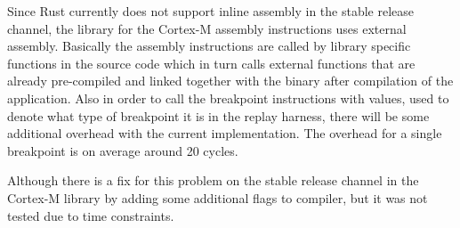 Since Rust currently does not support inline assembly in the stable release
channel, the library for the Cortex-M assembly instructions uses external
assembly. Basically the assembly instructions are called by library specific
functions in the source code which in turn calls external functions that are
already pre-compiled and linked together with the binary after compilation of
the application. Also in order to call the breakpoint instructions with values,
used to denote what type of breakpoint it is in the replay harness, there will
be some additional overhead with the current implementation. The overhead for a
single breakpoint is on average around 20 cycles.

Although there is a fix for this problem on the stable release channel in the
Cortex-M library by adding some additional flags to compiler, but it was not
tested due to time constraints.

